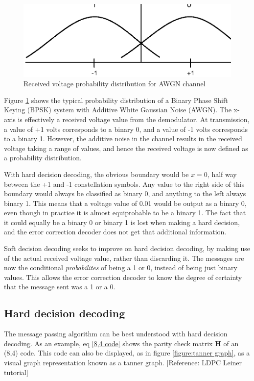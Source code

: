 \documentclass[11pt]{article}
\numberwithin{equation}{subsection}
\begin{document}
\begin{figure}[h]
\centering
\includegraphics{BPSK_channel_graph}
\caption{Received voltage probability distribution for AWGN channel}
\label{figure:awgn probability graph}
\end{figure}

Figure \ref{figure:awgn probability graph} shows the typical probability distribution of a Binary Phase Shift Keying (BPSK) system with Additive White Gaussian Noise (AWGN). The x-axis is effectively a received voltage value from the demodulator. At transmission, a value of +1 volts corresponds to a binary 0, and a value of -1 volts corresponds to a binary 1. However, the additive noise in the channel results in the received voltage taking a range of values, and hence the received voltage is now defined as a probability distribution.

With hard decision decoding, the obvious boundary would be $x = 0$, half way between the +1 and -1 constellation symbols. Any value to the right side of this boundary would always be classified as binary 0, and anything to the left always binary 1. This means that a voltage value of 0.01 would be output as a binary 0, even though in practice it is almost equiprobable to be a binary 1. The fact that it could equally be a binary 0 or binary 1 is lost when making a hard decision, and the error correction decoder does not get that additional information.

Soft decision decoding seeks to improve on hard decision decoding, by making use of the actual received voltage value, rather than discarding it. The messages are now the conditional \textit{probabilites} of being a 1 or 0, instead of being just binary values. This allows the error correction decoder to know the degree of certainty that the message sent was a 1 or a 0.

\subsection{Hard decision decoding}
The message passing algorithm can be best understood with hard decision decoding. As an example, eq \ref{8,4 code} shows the parity check matrix $\mathbf{H}$ of an (8,4) code. This code can also be displayed, as in figure \ref{figure:tanner graph}, as a visual graph representation known as a tanner graph. [Reference: LDPC Leiner tutorial]
\end{document}
